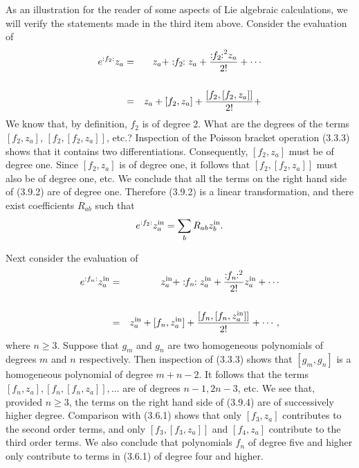      As an illustration for the reader of some aspects of Lie algebraic
calculations, we will verify the statements made in the third item above.  Consider
the evaluation of
\begin{eqnarray}
    e^{:f_2:} z_a & = & z_a + \Lieop(f_2) z_a + \frac{{\Lieop(f_2)}^{2} z_a}{2!} + \cdots \nonumber \\
                        &   & \nonumber \\
                        & = & z_a + [f_2,z_a] + \frac{[f_2,[f_2,z_a]]}{2!} +
\end{eqnarray}
We know that, by definition, $f_2$  is of degree 2.  What are
the degrees of the terms $[f_2,z_a]$, $[f_2,[f_2,z_a]]$, etc.?
Inspection of the Poisson bracket operation (3.3.3) shows that it contains two
differentiations. Consequently, $[f_2,z_a]$ must be of degree one.  Since
$[f_2,z_a]$ is of degree one, it follows that $[f_2,[f_2,z_a]]$ must
also be of degree one, etc.  We conclude that all the terms on the right hand
side of (3.9.2) are of degree one.  Therefore (3.9.2) is a linear
transformation, and there exist coefficients $R_{ab}$   such that
\begin{equation}
       e^{:f_2:} z_a^{\mbox{\scriptsize in}}   = \sum_b R_{ab} z_b^{\mbox{\scriptsize in}}.
\end{equation}

     Next consider the evaluation of
\begin{eqnarray}
  e^{:f_n:} z_a^{\mbox{\scriptsize in}} & = & z_a^{\mbox{\scriptsize in}} + \Lieop(f_n) z_a^{\mbox{\scriptsize in}} + \frac{\Lieop(f_n)^2}{2!}z_a^{\mbox{\scriptsize in}} + \cdots \nonumber \\
 &   &  \nonumber \\
 & = & z_a^{\mbox{\scriptsize in}} + [f_n,z_a^{\mbox{\scriptsize in}}] + \frac{[f_n,[f_n,z_a^{\mbox{\scriptsize in}}]]}{2!} + \cdots,
\end{eqnarray}
where $n \geq 3$.  Suppose that $g_m$ and $g_n$  are two homogeneous polynomials of
degrees $m$ and $n$ respectively.  Then inspection of (3.3.3) shows that
$[g_m,g_n]$ is a homogeneous polynomial of degree $m+n-2$.  It follows that the
terms $[f_n,z_a], [f_n,[f_n,z_a]], \ldots$ are of degrees $n-1, 2n-3$, etc.  We see
that, provided $n \geq 3$, the terms on the right hand side of (3.9.4) are of
successively higher degree. Comparison with (3.6.1) shows that only $[f_3,z_a]$
contributes to the second order terms, and only $[f_3,[f_3,z_a]]$ and $[f_4,z_a]$
contribute to the third order terms.  We also conclude that polynomials $f_n$
of degree five and higher only contribute to terms in (3.6.1) of degree
four and higher.

